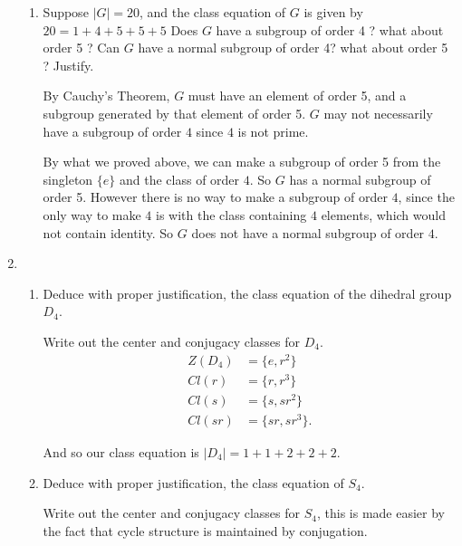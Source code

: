 \documentclass{article}
\begin{document}
\begin{enumerate}
\begin{enumerate}[label= (\alph*)]
        \item Suppose $|G| = 20$, and the class equation of $G$ is given by $20 = 1 + 4 + 5 + 5 + 5$
            Does $G$ have a subgroup of order 4 ? what about order 5 ? Can $G$
            have a normal subgroup of order 4? what about order 5 ? Justify.

            By Cauchy's Theorem, $G$ must have an element of order 5, and a subgroup generated by
            that element of order 5. $G$ may not necessarily have a subgroup of order $4$ since $4$
            is not prime.

            By what we proved above, we can make a subgroup of order 5 from the singleton $\{e\} $ and
            the class of order $4$. So $G$ has a normal subgroup of order 5. However there is no way
            to make a subgroup of order $4$, since the only way to make $4$ is with the class
            containing $4$ elements, which would not contain identity. So $G$ does not have a normal 
            subgroup of order $4$.

    \end{enumerate}
\item \begin{enumerate}[label= (\alph*)] 
        \item  Deduce with proper justification, the class equation of the dihedral group $D_4$.
    
            Write out the center and conjugacy classes for $D_4$.
            \begin{align*}
                Z(D_4)&= \{e,r^2\}  \\
                Cl(r)&= \{r,r^3\}  \\
                Cl(s)&=\{s,s r^2\} \\
                Cl(sr)&= \{s r,s r^3\}  
            .\end{align*}

            And so our class equation is $|D_4|=1+1+2+2+2$.

        \item Deduce with proper justification, the class equation of $S_4$.

            Write out the center and conjugacy classes for $S_4$, this is made easier by 
            the fact that cycle structure is maintained by conjugation.


\end{enumerate}
\end{enumerate}
\end{document}
